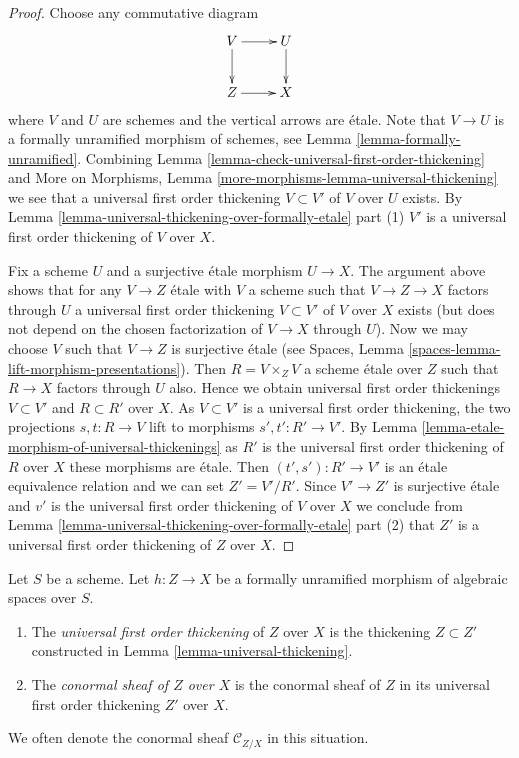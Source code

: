 \begin{proof}
Choose any commutative diagram
$$
\xymatrix{
V \ar[d] \ar[r] & U \ar[d] \\
Z \ar[r] & X
}
$$
where $V$ and $U$ are schemes and the vertical arrows are \'etale.
Note that $V \to U$ is a formally unramified morphism of schemes, see
Lemma \ref{lemma-formally-unramified}.
Combining
Lemma \ref{lemma-check-universal-first-order-thickening}
and
More on Morphisms, Lemma \ref{more-morphisms-lemma-universal-thickening}
we see that a universal first order thickening $V \subset V'$
of $V$ over $U$ exists. By
Lemma \ref{lemma-universal-thickening-over-formally-etale} part (1)
$V'$ is a universal first order thickening of $V$ over $X$.

\medskip\noindent
Fix a scheme $U$ and a surjective \'etale morphism $U \to X$.
The argument above shows that for any $V \to Z$ \'etale with $V$
a scheme such that $V \to Z \to X$ factors through $U$ a
universal first order thickening $V \subset V'$ of $V$ over $X$
exists (but does not depend on the chosen factorization of $V \to X$
through $U$). Now we may choose $V$ such that $V \to Z$ is surjective
\'etale (see
Spaces, Lemma \ref{spaces-lemma-lift-morphism-presentations}).
Then $R = V \times_Z V$ a scheme \'etale over $Z$ such that
$R \to X$ factors through $U$ also.
Hence we obtain universal first order thickenings
$V \subset V'$ and $R \subset R'$ over $X$.
As $V \subset V'$ is a universal first order thickening,
the two projections $s, t : R \to V$ lift to morphisms
$s', t': R' \to V'$. By
Lemma \ref{lemma-etale-morphism-of-universal-thickenings}
as $R'$ is the universal first order thickening of $R$ over $X$
these morphisms are \'etale.
Then $(t', s') : R' \to V'$ is an \'etale equivalence relation
and we can set $Z' = V'/R'$. Since $V' \to Z'$ is surjective \'etale
and $v'$ is the universal first order thickening of $V$ over $X$
we conclude from
Lemma \ref{lemma-universal-thickening-over-formally-etale} part (2)
that $Z'$ is a universal first order thickening of $Z$ over $X$.
\end{proof}

\begin{definition}
\label{definition-universal-thickening}
Let $S$ be a scheme.
Let $h : Z \to X$ be a formally unramified morphism of
algebraic spaces over $S$.
\begin{enumerate}
\item The {\it universal first order thickening} of $Z$ over $X$
is the thickening $Z \subset Z'$ constructed in
Lemma \ref{lemma-universal-thickening}.
\item The {\it conormal sheaf of $Z$ over $X$} is the conormal sheaf
of $Z$ in its universal first order thickening $Z'$ over $X$.
\end{enumerate}
We often denote the conormal sheaf $\mathcal{C}_{Z/X}$ in this situation.
\end{definition}

